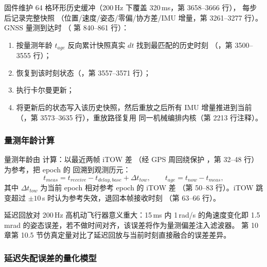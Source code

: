 固件维护 64 格环形历史缓冲（200\,Hz 下覆盖 320\,ms，第 3658--3666 行），
每步  后记录完整快照 
（位置/速度/姿态/零偏/协方差/IMU 增量，第 3261--3277 行）。GNSS 量测到达时
（ 第 840--861 行）：
\begin{enumerate}
  \item 按量测年龄 $t_{age}$ 反向累计快照真实 $dt$ 找到最匹配的历史时刻
    （，第 3500--3555 行）；
  \item 恢复到该时刻状态（，第 3557--3571 行）；
  \item 执行卡尔曼更新；
  \item 将更新后的状态写入该历史快照，然后重放之后所有 IMU 增量推进到当前
    （，第 3573--3635 行），重放路径复用
    同一机械编排内核（第 2213 行注释）。
\end{enumerate}

\subsubsection{量测年龄计算}

量测年龄由  计算：以最近两帧 iTOW 差
（经 GPS 周回绕保护 ，第 32--48 行）为参考，把
epoch 的  回溯到观测历元：
\begin{equation}
  t_{meas} = t_{receive} - t_{delay,base} + \Delta t_{tow},
  \qquad
  t_{age} = t_{now} - t_{meas},
  \label{eq:epoch-age}
\end{equation}
其中 $\Delta t_{tow}$ 为当前 epoch 相对参考 epoch 的 iTOW 差
（第 50--83 行）。iTOW 跳变超过 $\pm10$\,s 时认为参考失效，退回本帧接收时刻
（第 63--66 行）。

\begin{remark}
延迟回放对 200\,Hz 高机动飞行器意义重大：15\,ms 内 1\,rad/s 的角速度变化即
1.5\,mrad 的姿态误差，若不做时间对齐，该误差将作为量测偏差注入滤波器。
第 10 章第 10.5 节仿真定量对比了延迟回放与当前时刻直接融合的误差差异。
\end{remark}

\subsubsection{延迟失配误差的量化模型}


